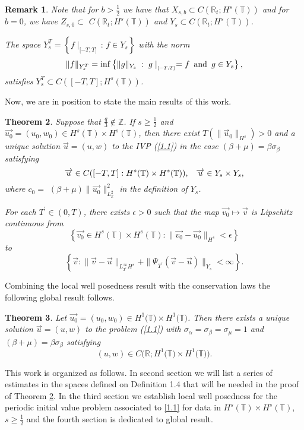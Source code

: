 \documentclass[reqno]{amsart}
\newtheorem{theorem}{Theorem}[section]
\newtheorem{remark}[theorem]{Remark}
\numberwithin{equation}{section}
\begin{document}
\begin{remark}
Note that for $b>\frac{1}{2}$ we have that  $X_{s,b}\subset C(\mathbb{R}_{t};H^{s}(\mathbb{T}))$ and
 for $b=0$, we have $Z_{s,0}\subset$
$C(\mathbb{R}_{t};H^{s}(\mathbb{T}))$ and $Y_{s}\subset C(\mathbb{R}_{t};H^{s}(\mathbb{T}))$.

The space $Y_{s}^{T}=\left\{  f\mid_{\lbrack-T,T]}\,:\,f\in Y_{s}\right\} $
with the norm
\[
\| f\| _{Y_{s}^{T}}=\inf\left\{  \|g\| _{Y_{s}}\;:\;
g\mid_{_{\lbrack-T,T]}}=f\text{\hskip5pt and\hskip5pt}g\in Y_{s}\right\},
\]
satisfies $Y_{s}^{T}\subset C([-T,T];H^{s}(\mathbb{T}))$.
\end{remark}

Now, we are in position to state the main results of this work.

\begin{theorem}\label{teo1.7}
Suppose that $\frac{q}{3}\notin\mathbb{Z}$. If $s\geq\frac{1}{2}$
and $\overrightarrow{u_0}=\left(  u_{0},w_{0}\right)  \in H^{s}(\mathbb{T})\times H^{s}(\mathbb{T})$, then there exist $T(\| \overrightarrow{u}_{0}\| _{H^{s}})>0$ and a unique solution
$\overrightarrow{u}=(u,w)$ to the IVP (\ref{1.1}) in the case
$(\beta+\mu)=\beta\sigma_{\beta}$ satisfying
\[
\overrightarrow{u}\in C([-T,T]:H^{s}(\mathbb{T})\times H^{s}(\mathbb{T}))\text{,\quad}\overrightarrow{u}\in Y_{s}\times Y_{s}\text{,}\]
where $c_{0}=$ $(\beta+\mu)\|
\overrightarrow{u_0}\| _{L_{x}^{2}}^{2}$ in the
definition of $Y_{s}$.

For each $T^{\prime}\in(0,T)$, there exists $\epsilon>0$ such that
the map $\overrightarrow{{v}_{0}}\mapsto\overrightarrow{v}$ is
Lipschitz continuous from
\[
\left\{  \overrightarrow{{v}_{0}}\in H^{s}(\mathbb{T})\times H^{s}
(\mathbb{T}):\| \overrightarrow{{v}_{0}}-\overrightarrow{{u}
_{0}}\| _{H^{s}}<\epsilon\right\}
\]
to
\[
\left\{  \overrightarrow{v}:\|
\overrightarrow{v}-\overrightarrow
{u}\| _{L_{T^{\prime}}^{\infty}H^{s}}+\| \Psi_{T^{\prime}}(\overrightarrow{v}-\overrightarrow{u})\|
_{Y_{s}}<\infty\right\}
\text{.}\]

\end{theorem}

Combining the local well posedness result with the conservation
laws the following global result follows.

\begin{theorem}\label{teo1.8}
Let $\overrightarrow{u_0}=\left(  u_{0},w_{0}\right)  \in H^{1}(\mathbb{T)}\times H^{1}(\mathbb{T)}$. Then there exists a unique
solution $\overrightarrow{u}=\left( u,w\right) $ to the problem
(\ref{1.1}) with $\sigma_{\alpha}=\sigma_{\beta}=\sigma_{\mu}=1$
and $(\beta+\mu)=\beta\sigma_{\beta}$ satisfying
\[
\left(  u,w\right)  \in C(\mathbb{R};H^{1}(\mathbb{T)\times}H^{1}(\mathbb{T))}\text{.}\]
\end{theorem}
This work is organized as follows. In second section we will list
a series of estimates in the spaces defined on Definition 1.4 that
will be needed in the proof of Theorem \ref{teo1.7}.
 In the third section we establish local well posedness for the periodic initial value problem
associated to \eqref{1.1} for data in $H^{s}(\mathbb{T})\times H^s(\mathbb{T})$,
$s\geq\frac{1}{2}$ and the fourth section is dedicated to global result.
\end{document}
